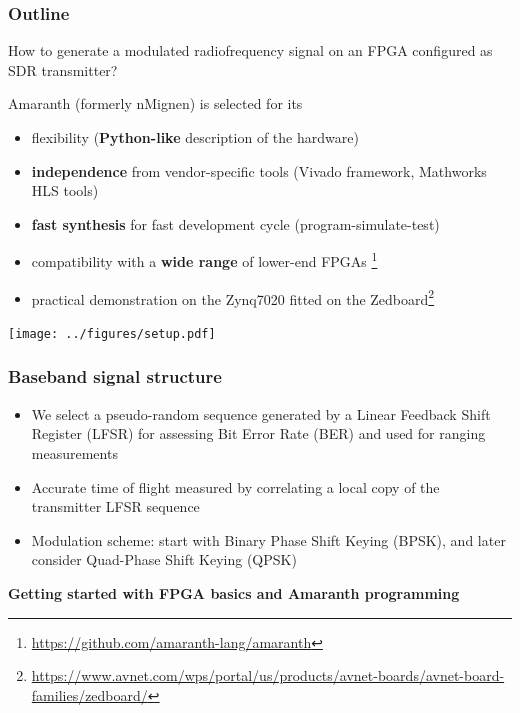 \documentclass[compress,10pt,aspectratio=169]{beamer}
\begin{document}
\begin{frame}\frametitle{Outline}

How to generate a modulated radiofrequency signal on an FPGA configured as SDR transmitter?  

Amaranth (formerly nMignen) is selected for its 
\begin{itemize}
\item flexibility ({\bf Python-like} description of the hardware)
\item {\bf independence} from vendor-specific tools (Vivado framework, Mathworks HLS tools)
\item {\bf fast synthesis} for fast development cycle (program-simulate-test)
\item compatibility with a {\bf wide range} of lower-end FPGAs \footnote{\url{https://github.com/amaranth-lang/amaranth}}
\item practical demonstration on the Zynq7020 fitted on the Zedboard\footnote{\url{https://www.avnet.com/wps/portal/us/products/avnet-boards/avnet-board-families/zedboard/}}
\end{itemize}

\begin{center}
\texttt{[image: ../figures/setup.pdf]}

\end{center}
\end{frame}

\begin{frame}\frametitle{Baseband signal structure}

\begin{itemize}
\item We select a pseudo-random sequence generated by a Linear Feedback Shift Register (LFSR) for assessing Bit Error 
Rate (BER) and used for ranging measurements
\item Accurate time of flight measured by correlating a local copy of the transmitter LFSR sequence
\item Modulation scheme: start with Binary Phase Shift Keying (BPSK), and later consider Quad-Phase Shift Keying (QPSK)
\end{itemize}

\begin{center}
\vfill

\vfill
{\bf Getting started with FPGA basics and Amaranth programming}
\end{center}
\vfill
\end{frame}
\end{document}
